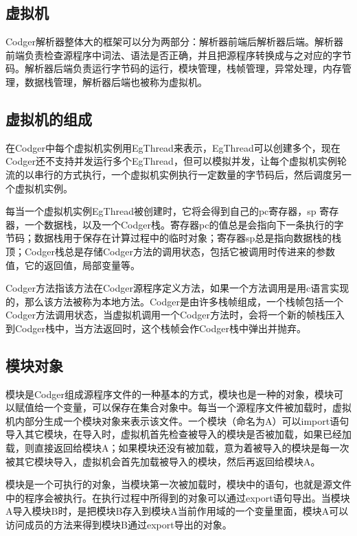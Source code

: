 \documentclass[a4paper,10pt]{article}
\begin{document}
\begin{CJK}{UTF8}{gbsn}
\section{虚拟机}
Codger解析器整体大的框架可以分为两部分：解析器前端后解析器后端。解析器前端负责检查源程序中词法、语法是否正确，并且把源程序转换成与之对应的字节码。解析器后端负责运行字节码的运行，模块管理，栈帧管理，异常处理，内存管理，数据栈管理，解析器后端也被称为虚拟机。
\subsection{虚拟机的组成}
在Codger中每个虚拟机实例用EgThread来表示，EgThread可以创建多个，现在Codger还不支持并发运行多个EgThread，但可以模拟并发，让每个虚拟机实例轮流的以串行的方式执行，一个虚拟机实例执行一定数量的字节码后，然后调度另一个虚拟机实例。

每当一个虚拟机实例EgThread被创建时，它将会得到自己的pc寄存器，sp 寄存器，一个数据栈，以及一个Codger栈。寄存器pc的值总是会指向下一条执行的字节码；数据栈用于保存在计算过程中的临时对象；寄存器sp总是指向数据栈的栈顶；Codger栈总是存储Codger方法的调用状态，包括它被调用时传进来的参数值，它的返回值，局部变量等。

Codger方法指该方法在Codger源程序定义方法，如果一个方法调用是用c语言实现的，那么该方法被称为本地方法。Codger是由许多栈帧组成，一个栈帧包括一个Codger方法调用状态，当虚拟机调用一个Codger方法时，会将一个新的帧栈压入到Codger栈中，当方法返回时，这个栈帧会作Codger栈中弹出并抛弃。
\subsection{模块对象}
模块是Codger组成源程序文件的一种基本的方式，模块也是一种的对象，模块可以赋值给一个变量，可以保存在集合对象中。每当一个源程序文件被加载时，虚拟机内部分生成一个模块对象来表示该文件。一个模块（命名为A）可以import语句导入其它模块，在导入时，虚拟机首先检查被导入的模块是否被加载，如果已经加载，则直接返回给模块A；如果模块还没有被加载，意为着被导入的模块是每一次被其它模块导入，虚拟机会首先加载被导入的模块，然后再返回给模块A。

模块是一个可执行的对象，当模块第一次被加载时，模块中的语句，也就是源文件中的程序会被执行。在执行过程中所得到的对象可以通过export语句导出。当模块A导入模块B时，是把模块B存入到模块A当前作用域的一个变量里面，模块A可以访问成员的方法来得到模块B通过export导出的对象。


\end{CJK}
\end{document}
